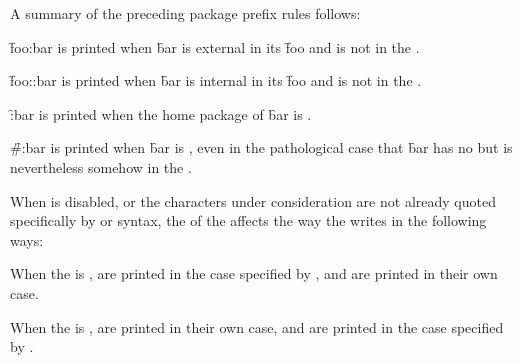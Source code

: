 A summary of the preceding package prefix rules follows:

\beginlist
{}

\f{foo:bar} is printed when  \f{bar} 
is external in its  \f{foo} 
and is not  in the .
         

\f{foo::bar} is printed when \f{bar} is internal in its 
\f{foo} and is not  in the .
         

\f{:bar} is printed when the home package of \f{bar} is .
                

\f{\#:bar} is printed when \f{bar} is ,
even in the pathological case that \f{bar} 
has no  but is nevertheless somehow  
in the .
\endlist


\endsubsubsubsection%


When 
 is disabled,
or the characters under consideration are not already 
quoted specifically by  or 
syntax,
the  of the  
affects the way the  writes 
in the following ways:
 
\beginlist
{}

 When the  is ,
  
 are printed in the case specified by , and
   are printed in their own case.
 

 When the  is ,
   are printed in their own case, and
  
 are printed in the case specified by .
 
